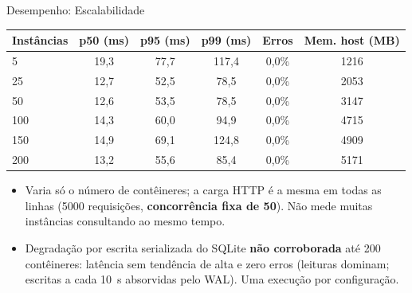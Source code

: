 \documentclass[aspectratio=169,xcolor=table]{beamer}
\begin{document}
\begin{frame}{Desempenho: Escalabilidade}
    \begin{table}
        \centering
        \footnotesize
        \begin{tabular}{lccccc}
            \toprule
            \textbf{Instâncias} & \textbf{p50 (ms)} & \textbf{p95 (ms)} & \textbf{p99 (ms)} & \textbf{Erros} & \textbf{Mem. host (MB)} \\
            \midrule
            5   & 19{,}3 & 77{,}7 & 117{,}4 & 0{,}0\% & 1216 \\
            25  & 12{,}7 & 52{,}5 & 78{,}5  & 0{,}0\% & 2053 \\
            50  & 12{,}6 & 53{,}5 & 78{,}5  & 0{,}0\% & 3147 \\
            100 & 14{,}3 & 60{,}0 & 94{,}9  & 0{,}0\% & 4715 \\
            150 & 14{,}9 & 69{,}1 & 124{,}8 & 0{,}0\% & 4909 \\
            200 & 13{,}2 & 55{,}6 & 85{,}4  & 0{,}0\% & 5171 \\
            \bottomrule
        \end{tabular}
    \end{table}
    \vspace{0.3cm}
    \begin{itemize}
        \item Varia só o número de contêineres; a carga HTTP é a mesma em todas as
              linhas (5000 requisições, \textbf{concorrência fixa de 50}). Não mede
              muitas instâncias consultando ao mesmo tempo.
        \item Degradação por escrita serializada do SQLite \textbf{não corroborada}
              até 200 contêineres: latência sem tendência de alta e zero erros
              (leituras dominam; escritas a cada 10~s absorvidas pelo WAL). Uma
              execução por configuração.
    \end{itemize}
\end{frame}
\end{document}

